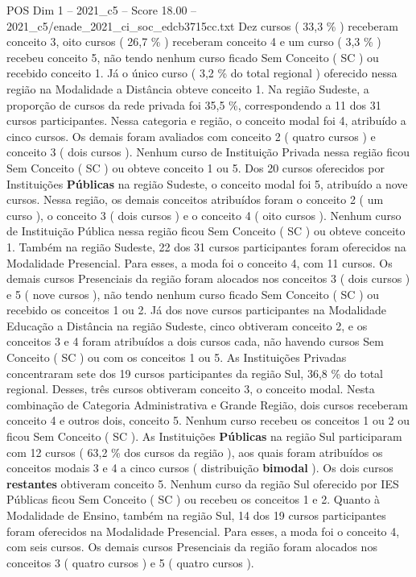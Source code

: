 \begin{textsample}{POS Dim 1 – 2021\_c5 – Score 18.00 – 2021\_c5/enade\_2021\_ci\_soc\_edcb3715cc.txt}
Dez cursos ( 33,3 \% ) receberam conceito 3, oito cursos ( 26,7 \% ) receberam conceito 4 e um curso ( 3,3 \% ) recebeu conceito 5, não tendo nenhum curso ficado Sem Conceito ( SC ) ou recebido conceito 1.
Já o único curso ( 3,2 \% do total regional ) oferecido nessa região na Modalidade a Distância obteve conceito 1.
Na região Sudeste, a proporção de cursos da rede privada foi 35,5 \%, correspondendo a 11 dos 31 cursos participantes.
Nessa categoria e região, o conceito modal foi 4, atribuído a cinco cursos.
Os demais foram avaliados com conceito 2 ( quatro cursos ) e conceito 3 ( dois cursos ).
Nenhum curso de Instituição Privada nessa região ficou Sem Conceito ( SC ) ou obteve conceito 1 ou 5.
Dos 20 cursos oferecidos por Instituições \textbf{Públicas} na região Sudeste, o conceito modal foi 5, atribuído a nove cursos.
Nessa região, os demais conceitos atribuídos foram o conceito 2 ( um curso ), o conceito 3 ( dois cursos ) e o conceito 4 ( oito cursos ).
Nenhum curso de Instituição Pública nessa região ficou Sem Conceito ( SC ) ou obteve conceito 1.
Também na região Sudeste, 22 dos 31 cursos participantes foram oferecidos na Modalidade Presencial.
Para esses, a moda foi o conceito 4, com 11 cursos.
Os demais cursos Presenciais da região foram alocados nos conceitos 3 ( dois cursos ) e 5 ( nove cursos ), não tendo nenhum curso ficado Sem Conceito ( SC ) ou recebido os conceitos 1 ou 2.
Já dos nove cursos participantes na Modalidade Educação a Distância na região Sudeste, cinco obtiveram conceito 2, e os conceitos 3 e 4 foram atribuídos a dois cursos cada, não havendo cursos Sem Conceito ( SC ) ou com os conceitos 1 ou 5.
As Instituições Privadas concentraram sete dos 19 cursos participantes da região Sul, 36,8 \% do total regional.
Desses, três cursos obtiveram conceito 3, o conceito modal.
Nesta combinação de Categoria Administrativa e Grande Região, dois cursos receberam conceito 4 e outros dois, conceito 5.
Nenhum curso recebeu os conceitos 1 ou 2 ou ficou Sem Conceito ( SC ).
As Instituições \textbf{Públicas} na região Sul participaram com 12 cursos ( 63,2 \% dos cursos da região ), aos quais foram atribuídos os conceitos modais 3 e 4 a cinco cursos ( distribuição \textbf{bimodal} ).
Os dois cursos \textbf{restantes} obtiveram conceito 5.
Nenhum curso da região Sul oferecido por IES Públicas ficou Sem Conceito ( SC ) ou recebeu os conceitos 1 e 2.
Quanto à Modalidade de Ensino, também na região Sul, 14 dos 19 cursos participantes foram oferecidos na Modalidade Presencial.
Para esses, a moda foi o conceito 4, com seis cursos.
Os demais cursos Presenciais da região foram alocados nos conceitos 3 ( quatro cursos ) e 5 ( quatro cursos ).

\end{textsample}
